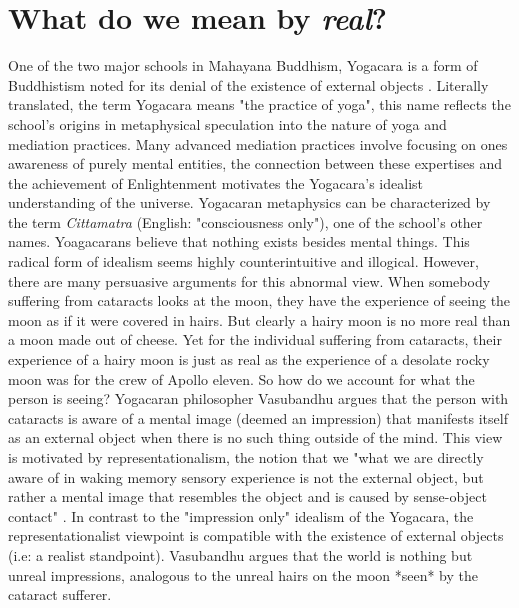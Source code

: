 \section{What do we mean by \textit{real}?}
One of the two major schools in Mahayana Buddhism, Yogacara is a form of Buddhistism noted for its denial of the existence of external objects \cite{siderits2007buddhism} . Literally translated, the term Yogacara means "the practice of yoga", this name reflects the school's origins in metaphysical speculation into the nature of yoga and mediation practices. Many advanced mediation practices involve focusing on ones awareness of purely mental entities, the connection between these expertises and the achievement of Enlightenment motivates the Yogacara's idealist understanding of the universe. Yogacaran metaphysics can be characterized by the term \textit{Cittamatra} (English: "consciousness only"), one of the school's other names. Yoagacarans believe that nothing exists besides mental things. This radical form of idealism seems highly counterintuitive and illogical. However, there are many persuasive arguments for this abnormal view. When somebody suffering from cataracts looks at the moon, they have the experience of seeing the moon as if it were covered in hairs. But clearly a hairy moon is no more real than a moon made out of cheese. Yet for the individual suffering from cataracts, their experience of a hairy moon is just as real as the experience of a desolate rocky moon was for the crew of Apollo eleven. So how do we account for what the person is seeing? Yogacaran philosopher Vasubandhu argues that the person with cataracts is aware of a mental image (deemed an impression) that manifests itself as an external object when there is no such thing outside of the mind. This view is motivated by representationalism, the notion that we "what we are directly aware of in waking memory sensory experience is not the external object, but rather a mental image that resembles the object and is caused by sense-object contact" \cite{siderits2007buddhism}.  \newline In contrast to the "impression only" idealism of the Yogacara, the representationalist viewpoint is compatible with the existence of external objects (i.e: a realist standpoint). Vasubandhu argues that the world is nothing but unreal impressions, analogous to the unreal hairs on the moon *seen* by the cataract sufferer.
\newline
